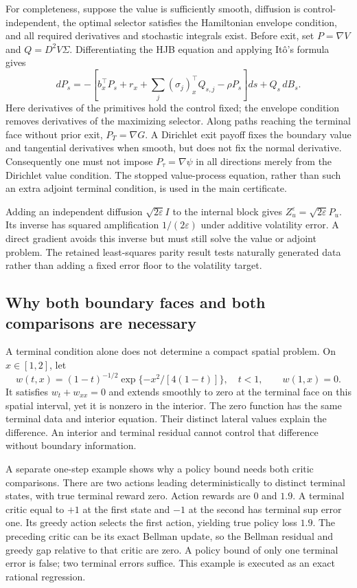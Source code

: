 \documentclass[11pt,letterpaper]{article}
\theoremstyle{definition}
\newcommand{\1}{\mathbf 1}
\begin{document}
For completeness, suppose the value is sufficiently smooth, diffusion is control-independent, the optimal selector satisfies the Hamiltonian envelope condition, and all required derivatives and stochastic integrals exist. Before exit, set $P=\nabla V$ and $Q=D^2V\Sigma$. Differentiating the HJB equation and applying It\^o's formula gives
\begin{equation}
 dP_s=-\left[b_x^\top P_s+r_x+\sum_j(\sigma_j)_x^\top Q_{s,j}-\rho P_s\right]ds+Q_s\,dB_s.
\end{equation}
Here derivatives of the primitives hold the control fixed; the envelope condition removes derivatives of the maximizing selector. Along paths reaching the terminal face without prior exit, $P_T=\nabla G$. A Dirichlet exit payoff fixes the boundary value and tangential derivatives when smooth, but does not fix the normal derivative. Consequently one must not impose $P_\tau=\nabla\psi$ in all directions merely from the Dirichlet value condition. The stopped value-process equation, rather than such an extra adjoint terminal condition, is used in the main certificate.

Adding an independent diffusion $\sqrt{2\varepsilon}I$ to the internal block gives $Z_u^\varepsilon=\sqrt{2\varepsilon}P_u$. Its inverse has squared amplification $1/(2\varepsilon)$ under additive volatility error. A direct gradient avoids this inverse but must still solve the value or adjoint problem. The retained least-squares parity result tests naturally generated data rather than adding a fixed error floor to the volatility target.

\subsection{Why both boundary faces and both comparisons are necessary}
A terminal condition alone does not determine a compact spatial problem. On $x\in[1,2]$, let
\[
 w(t,x)=(1-t)^{-1/2}\exp\{-x^2/[4(1-t)]\},\quad t<1,
 \qquad w(1,x)=0.
\]
It satisfies $w_t+w_{xx}=0$ and extends smoothly to zero at the terminal face on this spatial interval, yet it is nonzero in the interior. The zero function has the same terminal data and interior equation. Their distinct lateral values explain the difference. An interior and terminal residual cannot control that difference without boundary information.

A separate one-step example shows why a policy bound needs both critic comparisons. There are two actions leading deterministically to distinct terminal states, with true terminal reward zero. Action rewards are $0$ and $1.9$. A terminal critic equal to $+1$ at the first state and $-1$ at the second has terminal sup error one. Its greedy action selects the first action, yielding true policy loss $1.9$. The preceding critic can be its exact Bellman update, so the Bellman residual and greedy gap relative to that critic are zero. A policy bound of only one terminal error is false; two terminal errors suffice. This example is executed as an exact rational regression.
\end{document}

